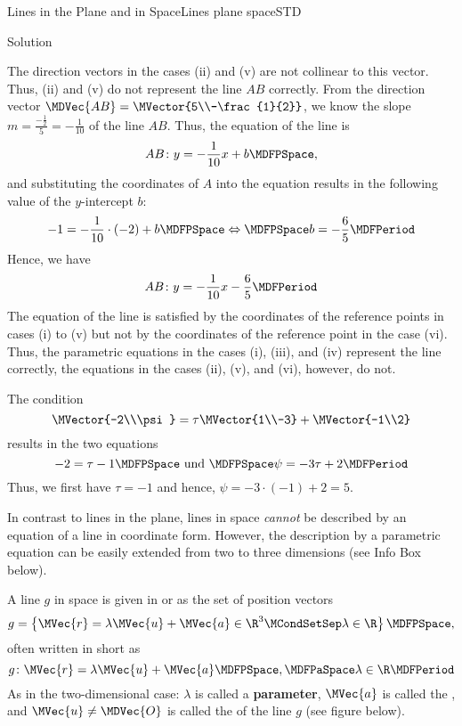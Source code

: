 \begin{MXContent}{Lines in the Plane and in Space}{Lines plane space}{STD}
\begin{MExercise}
\begin{MHint}{Solution}
\begin{MExerciseItems}
{\[\]
The direction vectors in the cases (ii) and (v) are not collinear to this vector. Thus, (ii) and (v)
do not represent the line $A B$ correctly. From the direction vector $\MDVec{A B}=\MVector{5\\-\frac{1}{2}}$, 
we know the slope $m=\frac{-\frac{1}{2}}{5}=-\frac{1}{10}$ of the line $A B$. Thus, the equation of the 
line is
\[
 A B\colon y=-\frac{1}{10}x+b \MDFPSpace ,
\]
and substituting the coordinates of $A$ into the equation results in the following value of the $y$-intercept 
$b$:
\[
 -1=-\frac{1}{10}\cdot(-2)+b\MDFPSpace\Leftrightarrow\MDFPSpace b=-\frac{6}{5}\MDFPeriod
\]
Hence, we have
\[
 A B\colon y=-\frac{1}{10}x-\frac{6}{5} \MDFPeriod
\]
The equation of the line is satisfied by the coordinates of the reference points in cases 
(i) to (v) but not by the coordinates of the reference point in the case (vi). Thus, the 
parametric equations in the cases (i), (iii), and (iv) represent the line correctly, the equations in the 
cases (ii), (v), and (vi), however, do not.
}
\item{
The condition 
\[
 \MVector{-2\\\psi} = \tau\MVector{1\\-3}+\MVector{-1\\2}
\]
results in the two equations
\[
 -2=\tau-1\MDFPSpace\textrm{ und }\MDFPSpace\psi=-3\tau+2 \MDFPeriod
\]
Thus, we first have $\tau=-1$ and hence, $\psi=-3\cdot(-1)+2=5$.
}
\end{MExerciseItems}
\end{MHint}

\end{MExercise}

In contrast to lines in the plane, lines in space \emph{cannot} be described by an equation of a line 
in coordinate form. However, the description by a parametric equation can be easily extended from two 
to three dimensions (see Info Box below).

\begin{MInfo}
A line $g$ in space is given in  or 
as the set of position vectors
\[
 g=\left\{\MVec{r}=\lambda\MVec{u}+\MVec{a}\in\R^3\MCondSetSep\lambda\in\R\right\} \MDFPSpace,
\]
often written in short as
\[
 g\colon \MVec{r}=\lambda\MVec{u}+\MVec{a}\MDFPSpace,\MDFPaSpace\lambda\in\R\MDFPeriod
\]
As in the two-dimensional case: $\lambda$ is called a \textbf{parameter}, $\MVec{a}$ is called the
, and $\MVec{u}\neq\MDVec{O}$ is called 
the  of the line $g$ (see figure below).
\begin{center}
\MTikzAuto{%
\begin{tikzpicture}[>=stealth]


\end{tikzpicture}}
\end{center}
\end{MInfo}
\end{MXContent}
